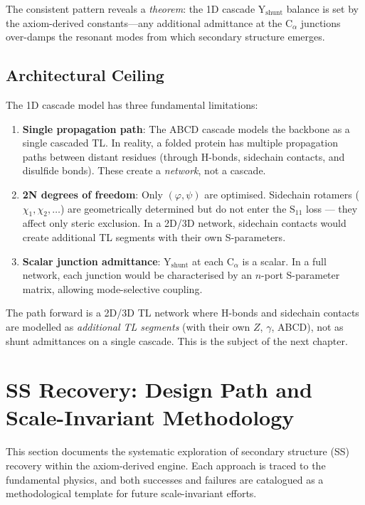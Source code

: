 \noindent The consistent pattern reveals a \emph{theorem}: the 1D cascade Y$_\text{shunt}$ balance is set by the axiom-derived constants---any additional admittance at the C$_\alpha$ junctions over-damps the resonant modes from which secondary structure emerges.

\subsection{Architectural Ceiling}

The 1D cascade model has three fundamental limitations:

\begin{enumerate}
    \item \textbf{Single propagation path}: The ABCD cascade models the backbone as a single cascaded TL.  In reality, a folded protein has multiple propagation paths between distant residues (through H-bonds, sidechain contacts, and disulfide bonds).  These create a \emph{network}, not a cascade.
    
    \item \textbf{2N degrees of freedom}: Only $(\varphi, \psi)$ are optimised.  Sidechain rotamers ($\chi_1, \chi_2, \ldots$) are geometrically determined but do not enter the S$_{11}$ loss --- they affect only steric exclusion.  In a 2D/3D network, sidechain contacts would create additional TL segments with their own S-parameters.
    
    \item \textbf{Scalar junction admittance}: Y$_\text{shunt}$ at each C$_\alpha$ is a scalar.  In a full network, each junction would be characterised by an $n$-port S-parameter matrix, allowing mode-selective coupling.
\end{enumerate}

\noindent The path forward is a 2D/3D TL network where H-bonds and sidechain contacts are modelled as \emph{additional TL segments} (with their own $Z$, $\gamma$, ABCD), not as shunt admittances on a single cascade.  This is the subject of the next chapter.


\section{SS Recovery: Design Path and Scale-Invariant Methodology}
\label{sec:ss_recovery}

This section documents the systematic exploration of secondary structure (SS) recovery within the axiom-derived engine.  Each approach is traced to the fundamental physics, and both successes and failures are catalogued as a methodological template for future scale-invariant efforts.

